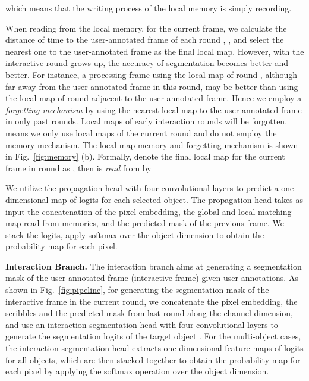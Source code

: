 \documentclass[10pt,twocolumn,letterpaper]{article}
\begin{document}
which means that the writing process of the local memory is simply recording.

When reading from the local memory, for the current  frame, we calculate the distance of time to the user-annotated  frame of each round , , and select the nearest one to the user-annotated frame as the final local map.
However, with the interactive round grows up, the accuracy of segmentation becomes better and better. For instance, a processing frame using the local map of round , although far away from the user-annotated frame in this round, may be better than using the local map of round  adjacent to the user-annotated frame. Hence we employ a \emph{forgetting mechanism} by using the nearest local map to the user-annotated frame in only past  rounds. Local maps of early interaction rounds will be forgotten.  means we only use local maps of the current round and do not employ the memory mechanism. The local map memory and forgetting mechanism is shown in Fig.~\ref{fig:memory} (b). Formally, denote the final local map for the current  frame in round  as , then  is \emph{read} from  by



We utilize the propagation head with four convolutional layers to predict a one-dimensional map of logits for each selected object. The propagation head takes as input the concatenation of the pixel embedding, the global and local matching map read from memories, and the predicted mask of the previous frame. We stack the logits, apply softmax over the object dimension to obtain the probability map for each pixel.

\textbf{ Interaction Branch.}
The interaction branch aims at generating a segmentation mask of the user-annotated frame (interactive frame) given user annotations. As shown in Fig.~\ref{fig:pipeline}, for generating the segmentation mask of the interactive frame in the current round, we concatenate the pixel embedding, the scribbles and the predicted mask from last round along the channel dimension, and use an interaction segmentation head with four convolutional layers to generate the segmentation logits of the target object . For the multi-object cases, the interaction segmentation head extracts one-dimensional feature maps of logits for all objects, which are then stacked together to obtain the probability map for each pixel by applying the softmax operation over the object dimension.
\end{document}
